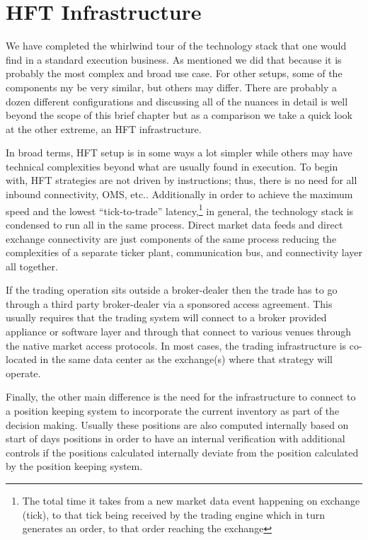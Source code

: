 \section{HFT Infrastructure}


We have completed the whirlwind tour of the technology stack that one would find in a standard execution business. As mentioned we did  that because it is probably the most complex and broad use case. For other setups, some of the components my be very similar, but others may differ. There are probably a dozen different configurations and discussing all of the nuances in detail is well beyond the scope of this brief chapter but as a comparison we take a quick look at the other extreme, an HFT infrastructure.


In broad terms, HFT setup is in some ways a lot simpler while others may have technical complexities beyond what are usually found in execution. To begin with, HFT strategies are not driven by instructions; thus, there is no need for all inbound connectivity, OMS, etc..  Additionally in order to achieve the maximum speed and the lowest  ``tick-to-trade'' latency,\footnote{The total time it takes from a new market data event happening on exchange (tick), to that tick being received by the trading engine which in turn generates an order, to that order reaching the exchange} in general, the technology stack is condensed to run all in the same process. Direct market data feeds and direct exchange connectivity are just components of the same process reducing the complexities of a separate ticker plant, communication bus, and connectivity layer all together. 


If the trading operation sits outside a broker-dealer then the trade has to go through a third party broker-dealer via a sponsored access agreement. This usually requires that the trading system will connect to a broker provided appliance or software layer and through that connect to various venues through the native market access protocols. In most cases, the trading infrastructure is co-located in the same data center as the exchange(s) where that strategy will operate.


Finally, the other main difference is the need for the infrastructure to connect to a position keeping system to incorporate the current inventory as part of the decision making. Usually these positions are also computed internally based on start of days positions in order to have an internal verification with additional controls if the positions calculated internally deviate from the position calculated by the position keeping system.


